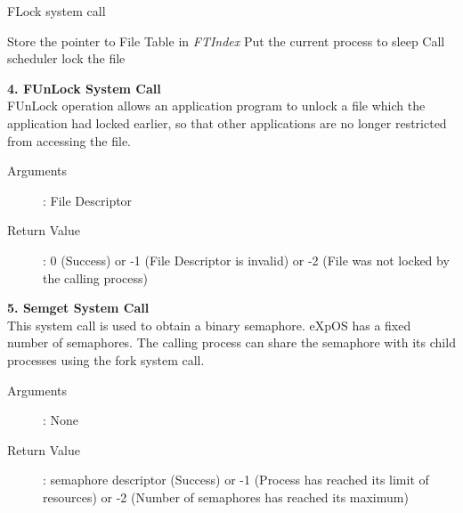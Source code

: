 \documentclass[11pt ,twosided]{article}
\begin{document}
\begin{algorithm}
\caption{FLock system call}
\begin{algorithmic}
\ENDIF
{}
\ELSE 
    \STATE Store the pointer to File Table in \textit{FTIndex}
\ENDIF
{}
            \STATE Put the current process to sleep
            \STATE Call scheduler
        \ENDWHILE
    \ENDIF
\ENDIF
\STATE lock the file
\end{algorithmic}
\end{algorithm}
\fi
\textbf{4. FUnLock System Call}
\\
FUnLock operation allows an application program to unlock a file which the application had locked earlier, so that other applications are no longer restricted from accessing the file.   
\begin{description}
\item[Arguments]: File Descriptor
\item[Return Value]: 0 (Success) or -1 (File Descriptor is invalid) or -2 (File was not locked by the calling process)
\end{description} 

\textbf{5. Semget System Call}
\\
This system call is used to obtain a binary semaphore. eXpOS has a fixed number of semaphores. The calling process can share the semaphore with its child processes using the fork system call. 
\begin{description}
\item[Arguments]: None
\item[Return Value]:  semaphore descriptor (Success) or -1 (Process has reached its limit of resources) or -2 (Number of semaphores has reached its maximum)
\end{description}
\end{document}
